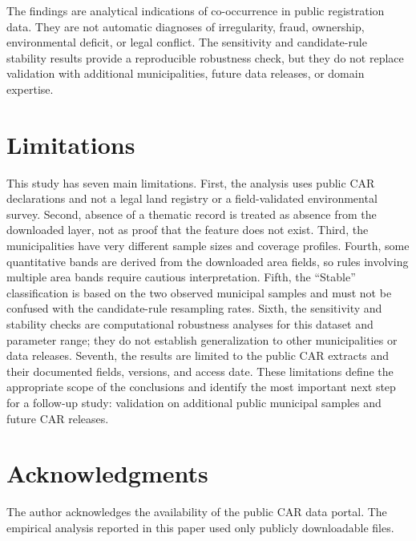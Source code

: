 \documentclass[11pt]{article}
\begin{document}
The findings are analytical indications of co-occurrence in public registration data. They are not automatic diagnoses of irregularity, fraud, ownership, environmental deficit, or legal conflict. The sensitivity and candidate-rule stability results provide a reproducible robustness check, but they do not replace validation with additional municipalities, future data releases, or domain expertise.

\section{Limitations}

This study has seven main limitations. First, the analysis uses public CAR declarations and not a legal land registry or a field-validated environmental survey. Second, absence of a thematic record is treated as absence from the downloaded layer, not as proof that the feature does not exist. Third, the municipalities have very different sample sizes and coverage profiles. Fourth, some quantitative bands are derived from the downloaded area fields, so rules involving multiple area bands require cautious interpretation. Fifth, the ``Stable'' classification is based on the two observed municipal samples and must not be confused with the candidate-rule resampling rates. Sixth, the sensitivity and stability checks are computational robustness analyses for this dataset and parameter range; they do not establish generalization to other municipalities or data releases. Seventh, the results are limited to the public CAR extracts and their documented fields, versions, and access date. These limitations define the appropriate scope of the conclusions and identify the most important next step for a follow-up study: validation on additional public municipal samples and future CAR releases.

\section*{Acknowledgments}

The author acknowledges the availability of the public CAR data portal. The empirical analysis reported in this paper used only publicly downloadable files.



\end{document}
